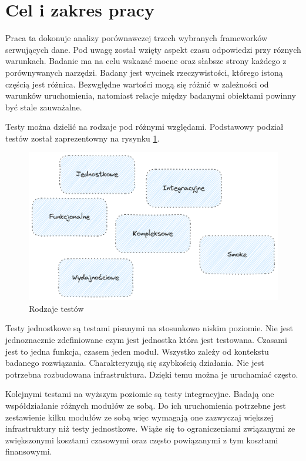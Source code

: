 \section{Cel i zakres pracy}

Praca ta dokonuje analizy porównawczej trzech wybranych frameworków serwujących dane.
Pod uwagę został wzięty aspekt czasu odpowiedzi przy róznych warunkach.
Badanie ma na celu wskazać mocne oraz słabsze strony każdego z porównywanych narzędzi.
Badany jest wycinek rzeczywistości, którego istoną częścią jest różnica.
Bezwględne wartości mogą się różnić w zależności od warunków uruchomienia, natomiast relacje między badanymi obiektami powinny być stale zauważalne.


Testy można dzielić na rodzaje pod różnymi względami. Podstawowy podział testów został zaprezentowny na rysynku \ref{rys:test-types}\cite{atlassianRneRodzaje}.
\begin{figure}[!hb]
	\centering \includegraphics[width=1\linewidth]{rysunki/test-types.png}
	\caption{Rodzaje testów}
	\label{rys:test-types}
\end{figure}
Testy jednostkowe są testami pisanymi na stosunkowo niskim poziomie.
Nie jest jednoznacznie zdefiniowane czym jest jednostka która jest testowana.
Czasami jest to jedna funkcja, czasem jeden moduł.
Wszystko zależy od kontekstu badanego rozwiązania.
Charakteryzują się szybkością działania.
Nie jest potrzebna rozbudowana infrastruktura.
Dzięki temu można je uruchamiać często.

Kolejnymi testami na wyższym poziomie są testy integracyjne.
Badają one współdziałanie różnych modułów ze sobą. 
Do ich uruchomienia potrzebne jest zestawienie kilku modułów ze sobą więc wymagają one zazwyczaj większej infrastruktury niż testy jednostkowe.
Wiąże się to ograniczeniami związanymi ze zwiększonymi kosztami czasowymi oraz często powiązanymi z tym kosztami finansowymi.

